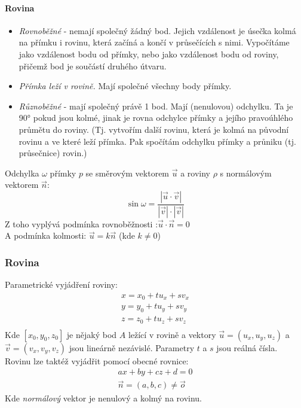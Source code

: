 \documentclass[12pt]{article}
\begin{document}
\paragraph{Rovina}
\begin{itemize}
\item \emph{Rovnoběžné} - nemají společný žádný bod. Jejich vzdálenost je úsečka kolmá na přímku i rovinu, která začíná a končí v průsečících s nimi. Vypočítáme jako vzdálenost bodu od přímky, nebo jako vzdálenost bodu od roviny, přičemž bod je součástí druhého útvaru.
\item \emph{Přímka leží v rovině.} Mají společné všechny body přímky.
\item \emph{Různoběžné} - mají společný právě 1 bod. Mají (nenulovou) odchylku. Ta je 90° pokud jsou kolmé, jinak je rovna odchylce přímky a jejího pravoúhlého průmětu do roviny. (Tj. vytvořím další rovinu, která je kolmá na původní rovinu a ve které leží přímka. Pak spočítám odchylku přímky a průniku (tj. průsečnice) rovin.)
\end{itemize}
Odchylka $\omega$ přímky $p$ se směrovým vektorem $\vec{u}$ a roviny $\rho$ s normálovým vektorem $\vec{n}$:
\begin{equation}
\sin \omega = \frac{|\vec{u}\cdot\vec{v}|}{|\vec{v}|\cdot|\vec{v}|}
\end{equation}
Z toho vyplývá podmínka rovnoběžnosti :$\vec{u} \cdot \vec{n} = 0$\\
A podmínka kolmosti:  $\vec{u} = k \vec{n}$ (kde $k \neq 0$)
\subsubsection{Rovina}
Parametrické vyjádření roviny:
\begin{align}
x = x_0 + tu_x + sv_x\\
y = y_0 + tu_y + sv_y\\
z = z_0 + tu_z + sv_z\\
\end{align}
Kde $[x_0,y_0,z_0]$ je nějaký bod $A$ ležící v rovině a vektory $\vec{u} = (u_x , u_y , u_z)$ a $\vec{v} = (v_x , v_y , v_z)$ jsou lineárně nezávislé. Parametry $t$ a $s$ jsou reálná čísla. \\
Rovinu lze taktéž vyjádřit pomocí obecné rovnice:
\begin{align}
ax +by +cz +d = 0\\
\vec{n} = (a,b,c) \neq \vec{o}
\end{align}
Kde \emph{normálový} vektor je nenulový a kolmý na rovinu.
\end{document}
